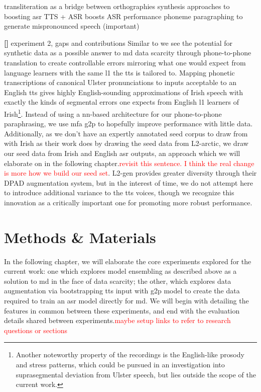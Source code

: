 \documentclass[thesis]{cluu}
\newcounter{paranum}
\newcommand{\numberedparagraph}{\par\refstepcounter{paranum}\textbf{[\theparanum] }}
\newcommand{\todo}[1]{\textcolor{red}{#1}}
\begin{document}
\textcite{khareLowResourceASR2021a} transliteration as a bridge between orthographies
\textcite{korzekwaComputerassistedPronunciationTraining2022} synthesis approaches to boosting asr
\textcite{barteldsMakingMoreLittle2023} TTS + ASR boosts ASR performance
\textcite{zhangL2GENNeuralPhoneme2022} phoneme paragraphing to generate mispronounced speech (important)
\numberedparagraph{experiment 2, gaps and contributions}
Similar to \textcite{zhangL2GENNeuralPhoneme2022} we see the potential for synthetic data as a possible answer to \gls{md} data scarcity through phone-to-phone translation to create controllable errors mirroring what one would expect from language learners with the same \gls{l1} the \gls{tts} is tailored to. Mapping phonetic transcriptions of canonical Ulster pronunciations to inputs acceptable to an English \gls{tts} gives highly English-sounding approximations of Irish speech with exactly the kinds of segmental errors one expects from English \gls{l1} learners of Irish\footnote{Another noteworthy property of the recordings is the English-like prosody and stress patterns, which could be pursued in an investigation into suprasegmental deviation from Ulster speech, but lies outside the scope of the current work.}. Instead of using a \gls{nn}-based architecture for our phone-to-phone paraphrasing, we use \gls{mfa} \gls{g2p} to hopefully improve performance with little data. Additionally, as we don't have an expertly annotated seed corpus to draw from with Irish as their work does by drawing the seed data from L2-arctic, we draw our seed data from Irish and English \gls{asr} outputs, an approach which we will elaborate on in the following chapter.\todo{revisit this sentence. I think the real change is more how we build our seed set}. L2-gen provides greater diversity through their DPAD augmentation system, but in the interest of time, we do not attempt here to introduce additional variance to the \gls{tts} voices, though we recognize this innovation as a critically important one for promoting more robust performance.

\chapter{Methods \& Materials}
In the following chapter, we will elaborate the core experiments explored for the current work: one which explores model ensembling as described above as a solution to \gls{md} in the face of data scarcity; the other, which explores data augmentation via bootstrapping \gls{tts} input with \gls{g2p} model to create the data required to train an \gls{asr} model directly for \gls{md}. We will begin with detailing the features in common between these experiments, and end with the evaluation details shared between experiments.\todo{maybe setup links to refer to research questions or sections}
\end{document}
